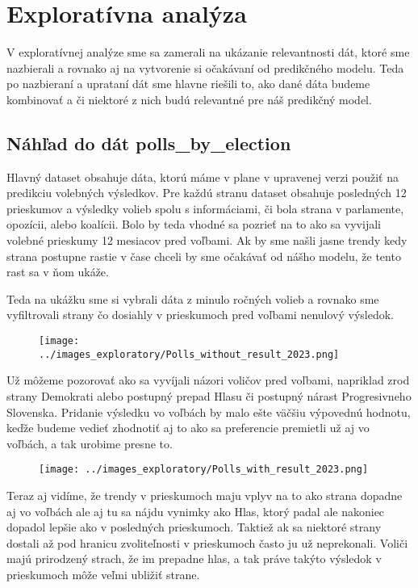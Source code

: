 \documentclass[main.tex]{subfiles}
\begin{document}
\section{Exploratívna analýza}
V exploratívnej analýze sme sa zamerali na ukázanie relevantnosti dát, ktoré sme nazbierali a rovnako aj na vytvorenie si očakávaní od predikčného modelu. Teda po nazbieraní a uprataní dát sme hlavne riešili to, ako dané dáta budeme kombinovať a či niektoré z nich budú relevantné pre náš predikčný model.

\subsection{Náhľad do dát polls_by_election}
Hlavný dataset obsahuje dáta, ktorú máme v plane v upravenej verzi použiť na predikciu volebných výsledkov. Pre každú stranu dataset obsahuje posledných 12 prieskumov a výsledky volieb spolu s informáciami, či bola strana v parlamente, opozícii, alebo koalícii. Bolo by teda vhodné sa pozrieť na to ako sa vyvijali volebné prieskumy 12 mesiacov pred voľbami. Ak by sme našli jasne trendy kedy strana postupne rastie v čase chceli by sme očakávať od nášho modelu, že tento rast sa v ňom ukáže. 

Teda na ukážku sme si vybrali dáta z minulo ročných volieb a rovnako sme vyfiltrovali strany čo dosiahly v prieskumoch pred voľbami nenulový výsledok. 
\begin{figure}[h]
    \centering
    \texttt{[image: ../images\_exploratory/Polls\_without\_result\_2023.png]}
    \caption{}
    \label{fig:example}
\end{figure}

Už môžeme pozorovať ako sa vyvíjali názori voličov pred voľbami, napriklad zrod strany Demokrati alebo postupný prepad Hlasu či postupný nárast Progresivneho Slovenska.
Pridanie výsledku vo voľbách by malo ešte väčšiu výpovednú hodnotu, keďže budeme vedieť zhodnotiť aj to ako sa preferencie premietli už aj vo voľbách, a tak urobime presne to.
\begin{figure}[h]
    \centering
    \texttt{[image: ../images\_exploratory/Polls\_with\_result\_2023.png]}
    \caption{}
    \label{fig:example}
\end{figure}

Teraz aj vidíme, že trendy v prieskumoch maju vplyv na to ako strana dopadne aj vo voľbách ale aj tu sa nájdu vynimky ako Hlas, ktorý padal ale nakoniec dopadol lepšie ako v posledných prieskumoch. Taktiež ak sa niektoré strany dostali až pod hranicu zvoliteľnosti v prieskumoch často ju už neprekonali. Voliči majú prirodzený strach, že im prepadne hlas, a tak práve takýto výsledok v prieskumoch môže veľmi ubližiť strane.
\end{document}
